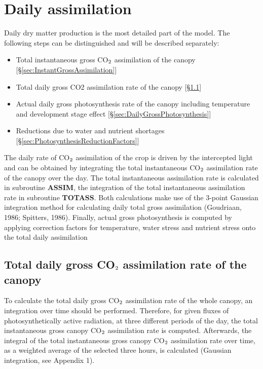 \section{Daily assimilation} 

Daily dry matter production is the most detailed part of the model. The following steps
can be distinguished and will be described separately:
\begin{itemize}
	\item Total instantaneous gross CO$_{{\rm 2}}$ assimilation of the canopy 
	[\S \ref{sec:InstantGrossAssimilation}]
	\item Total daily gross CO2 assimilation rate of the canopy 
    [\S \ref{sec:DailyGrossAssimilation}]
	\item Actual daily gross photosynthesis rate of the canopy
	including temperature and development stage effect
    [\S \ref{sec:DailyGrossPhotosynthesis}]
	\item Reductions due to water and nutrient shortages
    [\S \ref{sec:PhotosynthesisReductionFactors}]
\end{itemize}

The daily rate of CO$_{{\rm 2}}$ assimilation of the crop is driven by the intercepted light and can
be obtained by integrating the total instantaneous CO$_{{\rm 2}}$ assimilation rate of the canopy over
the day. The total instantaneous assimilation rate is calculated in subroutine {\bf ASSIM}, the
integration of the total instantaneous assimilation rate in subroutine {\bf TOTASS}. Both
calculations make use of the 3-point Gaussian integration method for calculating daily total 
gross assimilation (Goudriaan, 1986; Spitters, 1986).
Finally, actual gross photosynthesis is computed by applying correction factors for temperature,
water stress and nutrient stress onto the total daily assimilation

\subsection{Total daily gross CO$_{{\rm 2}}$ assimilation rate of the canopy}
\label{sec:DailyGrossAssimilation}

To calculate the total daily gross CO$_{{\rm 2}}$ assimilation rate of the whole canopy, an integration over time should be performed. Therefore, for given fluxes of photosynthetically
active radiation, at three different periods of the day, the total instantaneous gross canopy
CO$_{{\rm 2}}$ assimilation rate is computed. Afterwards, the integral of the total instantaneous
gross canopy CO$_{{\rm 2}}$ assimilation rate over time, as a weighted average of the selected three
hours, is calculated (Gaussian integration, see Appendix 1).

